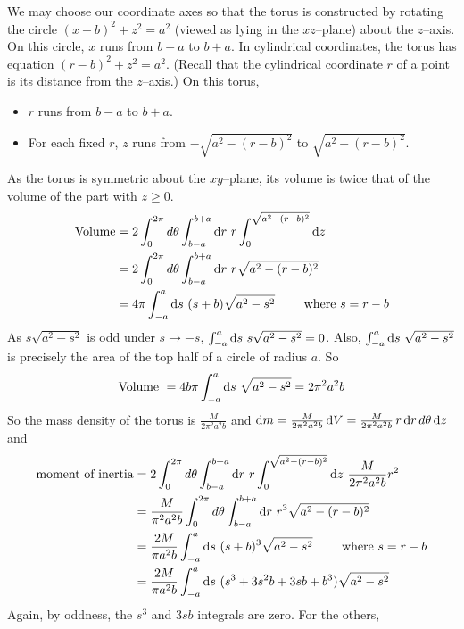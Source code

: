 \begin{solution}
 We may choose our coordinate axes so that the torus is constructed by rotating the circle $(x-b)^2+z^2=a^2$
(viewed as lying in the $xz$--plane) about the $z$--axis. On this circle,
$x$ runs from $b-a$ to $b+a$. 
%
In cylindrical coordinates, the torus has equation $(r-b)^2+z^2=a^2$. 
(Recall that the cylindrical coordinate $r$ of a point is its distance from the 
$z$--axis.)
On this torus, 
\begin{itemize}
\item $r$ runs from $b-a$ to $b+a$. 
\item For each fixed $r$, $z$ runs
from $-\sqrt{a^2-(r-b)^2}$ to $\sqrt{a^2-(r-b)^2}$. 
\end{itemize}
As the torus
is symmetric about the $xy$--plane, its volume is twice that of the volume 
of the part with $z\ge 0$. 
\begin{align*}
\text{Volume}
&= 2\int_{0}^{2\pi} d\theta\int_{b-a}^{b+a}\dee{r}\ r\int_{0}^{\sqrt{a^2-(r-b)^2}}\dee{z} \\
&= 2\int_{0}^{2\pi} d\theta\int_{b-a}^{b+a}\dee{r}\ r\sqrt{a^2-(r-b)^2} \\
&= 4\pi \int_{-a}^{a}\dee{s}\ (s+b)\sqrt{a^2-s^2}
\qquad\text{ where $s=r-b$}
\end{align*}
As $s\sqrt{a^2-s^2}$ is odd under $s\rightarrow -s$, 
$\int_{-a}^{a}\dee{s}\ s\sqrt{a^2-s^2}=0$. Also,  $\int_{-a}^{a}\mathrm{d}s\ \sqrt{a^2-s^2}$
is precisely the area of the top half of a circle of radius $a$. So
$$
\text{Volume }= 4b\pi \int_{-a}^{a}\mathrm{d}s\ \sqrt{a^2-s^2}
=2\pi^2a^2b
$$
So the mass density of the torus is $\frac{M}{2\pi^2a^2b}$ and
$\mathrm{d}m = \frac{M}{2\pi^2a^2b}\,\mathrm{d}V
          =\frac{M}{2\pi^2a^2b}\,r\,\mathrm{d}r\,d\theta\,\mathrm{d}z$ 
and
\begin{align*}
\text{moment of inertia}
&= 2\int_{0}^{2\pi} d\theta\int_{b-a}^{b+a}\dee{r}\ r\int_{0}^{\sqrt{a^2-(r-b)^2}}\dee{z}\ 
\frac{M}{2\pi^2a^2b} r^2 \\
&= \frac{M}{\pi^2a^2b}\int_{0}^{2\pi} d\theta\int_{b-a}^{b+a}\dee{r}\ r^3\sqrt{a^2-(r-b)^2} \\
&= \frac{2M}{\pi a^2b} \int_{-a}^{a}\dee{s}\ (s+b)^3\sqrt{a^2-s^2}
\qquad\text{ where $s=r-b$} \\
&= \frac{2M}{\pi a^2b} \int_{-a}^{a}\dee{s}\ (s^3+3s^2b+3sb+b^3)\sqrt{a^2-s^2}
\end{align*}
Again, by oddness, the $s^3$ and $3sb$ integrals are zero. For the others,

\end{solution}
